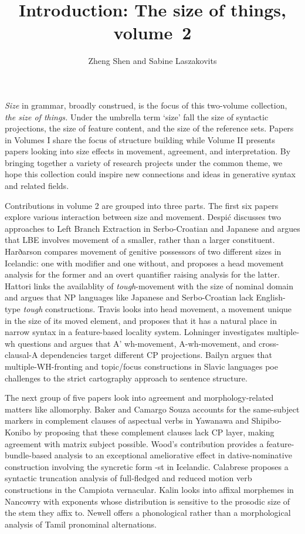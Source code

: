 \documentclass[output=paper]{langscibook}
\title{Introduction: The size of things, volume~2}
\author{
    Zheng Shen%
        \affiliation{National University of Singapore}
    and 
    Sabine Laszakovits%
        \affiliation{Austrian Academy of Sciences; University of Connecticut}
}
\begin{document}
\maketitle


\noindent \textit{Size} in grammar, broadly construed, is the focus of this two-volume collection, \textit{the size of things.}
Under the umbrella term `size' fall the size of syntactic projections, the size of feature content, and the size of the reference sets. 
Papers in Volumes I share the focus of structure building while Volume II presents papers looking into size effects in movement, agreement, and interpretation. 
By bringing together a variety of research projects under the common theme, we hope this collection could inspire new connections and ideas in generative syntax and related fields. 

Contributions in volume 2 are grouped into three parts. The first six papers explore various interaction between size and movement. 
Despić discusses two approaches to Left Branch Extraction in Serbo-Croatian and Japanese and argues that LBE involves movement of a smaller, rather than a larger constituent.
Harðarson compares movement of genitive possessors of two different sizes in Icelandic: one with modifier and one without, and proposes a head movement analysis for the former and an overt quantifier raising analysis for the latter.
Hattori links the availablity of \textit{tough}-movement with the size of nominal domain and argues that NP languages like Japanese and Serbo-Croatian lack English-type \textit{tough} constructions. 
Travis looks into head movement, a movement unique in the size of its moved element, and proposes that it has a natural place in narrow syntax in a feature-based locality system.
Lohninger investigates multiple-wh questions and argues that A' wh-movement, A-wh-movement, and cross-clausal-A dependencies target different CP projections. 
Bailyn argues that multiple-WH-fronting and topic/focus constructions in Slavic languages poe challenges to the strict cartography approach to sentence structure. 

The next group of five papers look into agreement and morphology-related matters like allomorphy. 
Baker and Camargo Souza accounts for the same-subject markers in complement clauses of aspectual verbs in Yawanawa and Shipibo-Konibo by proposing that these complement clauses lack CP layer, making agreement with matrix subject possible.
Wood's contribution provides a feature-bundle-based analysis to an exceptional ameliorative effect in dative-nominative construction involving the syncretic form -st in Icelandic.
Calabrese proposes a syntactic truncation analysis of full-fledged and reduced motion verb constructions in the Campiota vernacular. 
Kalin looks into affixal morphemes in Nancowry with exponents whose distribution is sensitive to the prosodic size of the stem they affix to.
Newell offers a phonological rather than a morphological analysis of Tamil pronominal alternations. 
\end{document}
